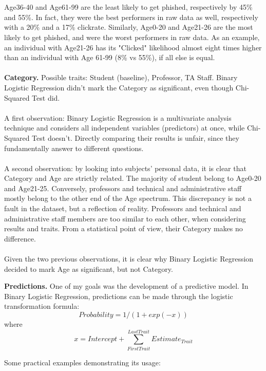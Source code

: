 \documentclass[a4paper]{article}
\begin{document}
\\ \\
Age36-40 and Age61-99 are the least likely to get phished, respectively by 45\% and 55\%. In fact, they were the best performers in raw data as well, respectively with a 20\% and a 17\% clickrate. Similarly, Age0-20 and Age21-26 are the most likely to get phished, and were the worst performers in raw data. As an example, an individual with Age21-26 has its "Clicked" likelihood almost eight times higher than an individual with Age 61-99 (8\% vs 55\%), if all else is equal.
\\ \\
\textbf{Category.} Possible traits: Student (baseline), Professor, TA Staff. Binary Logistic Regression didn't mark the Category as significant, even though Chi-Squared Test did.
\\ \\
A first observation: Binary Logistic Regression is a multivariate analysis technique and considers all independent variables (predictors) at once, while Chi-Squared Test doesn't. Directly comparing their results is unfair, since they fundamentally answer to different questions.
\\ \\
A second observation: by looking into subjects' personal data, it is clear that Category and Age are strictly related. The majority of student belong to Age0-20 and Age21-25. Conversely, professors and technical and administrative staff mostly belong to the other end of the Age spectrum. This discrepancy is not a fault in the dataset, but a reflection of reality. Professors and technical and administrative staff members are too similar to each other, when considering results and traits. From a statistical point of view, their Category makes no difference.
\\ \\
Given the two previous observations, it is clear why Binary Logistic Regression decided to mark Age as significant, but not Category.

\newpage

\noindent
\textbf{Predictions.} One of my goals was the development of a predictive model. In Binary Logistic Regression, predictions can be made through the logistic transformation formula:
\[ Probability = 1 / ( 1 + exp(-x)) \] 
where 
\[ x = Intercept + \sum_{FirstTrait}^{LastTrait} Estimate_{Trait} \]

\vspace{6mm}

\noindent
Some practical examples demonstrating its usage:
\end{document}
